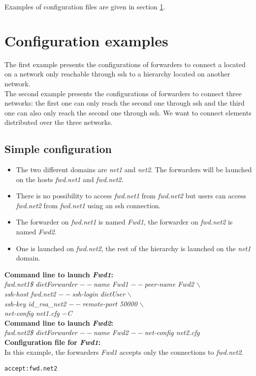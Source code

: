Examples of configuration files are given in section
\ref{sec:ForwarderExamples}.


\section{Configuration examples}
\label{sec:ForwarderExamples}
The first example presents the configurations of \diet forwarders to
connect a \sed located on a network only reachable through ssh to a
\diet hierarchy located on another network.\\

The second example presents the configurations of \diet forwarders to
connect three networks: the first one can only reach the second one
through ssh and the third one can also only reach the second one
through ssh. We want to connect \diet elements distributed over the
three networks.
\subsection{Simple configuration}
\begin{itemize}
\item The two different domains are \textit{net1} and \textit{net2}. The forwarders will
  be launched on the hosts \textit{fwd.net1} and \textit{fwd.net2}.
\item There is no possibility to access \textit{fwd.net1} from
  \textit{fwd.net2} but users can access \textit{fwd.net2} from
  \textit{fwd.net1} using an ssh connection.
\item The forwarder on \textit{fwd.net1} is named \textit{Fwd1}, the
  forwarder on \textit{fwd.net2} is named \textit{Fwd2}.
\item One \sed is launched on \textit{fwd.net2}, the rest of the \diet
  hierarchy is launched on the \textit{net1} domain.\\
\end{itemize}

\noindent\textbf{Command line to launch \textit{Fwd1}: }\\
{\small \it fwd.net1\$ dietForwarder {\tiny$--$}name Fwd1
  {\tiny$--$}peer-name Fwd2 $\backslash$\\
  \hspace*{4.2cm}{\tiny$--$}ssh-host fwd.net2 {\tiny$--$}ssh-login
  dietUser $\backslash$\\
  \hspace*{4.2cm}{\tiny$--$}ssh-key id\_rsa\_net2
  {\tiny$--$}remote-port 50000 $\backslash$\\
  \hspace*{4.2cm}{\tiny$--$}net-config net1.cfg {\tiny$-$}C}\\[2mm]
\noindent\textbf{Command line to launch \textit{Fwd2}: }\\
{\small \it fwd.net2\$ dietForwarder {\tiny$--$}name Fwd2
  {\tiny$--$}net-config net2.cfg}\\[3mm]
\noindent\textbf{Configuration file for \textit{Fwd1}:}\\
In this example, the forwarders \textit{Fwd1} accepts only the
connections to \textit{fwd.net2}.
\begin{verbatim}
accept:fwd.net2
\end{verbatim}

